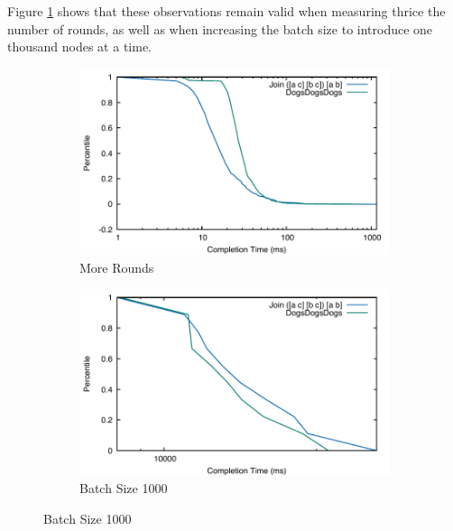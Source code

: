 \documentclass[../catalog.tex]{subfiles}
\begin{document}
Figure \ref{fig:triangle-cdfs-extended} shows that these observations
remain valid when measuring thrice the number of rounds, as well as
when increasing the batch size to introduce one thousand nodes at a
time.

\begin{figure}[h!]
  \begin{subfigure}{.5\textwidth}
    \includegraphics[width=1.0\linewidth]{results/triangles/out/extended_cdf}
    \caption{More Rounds}
  \end{subfigure}
  \begin{subfigure}{.5\textwidth}
    \includegraphics[width=1.0\linewidth]{results/triangles/out/batch_cdf}
    \caption{Batch Size 1000}
  \end{subfigure}

  \label{fig:triangle-cdfs-extended}
\end{figure}
\end{document}
